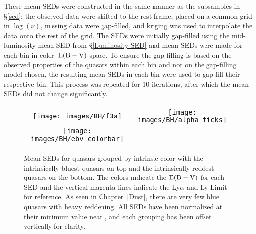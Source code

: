 These mean SEDs were constructed in the same manner as the subsamples in \S\ref{sed}: the observed data were shifted to the rest frame, placed on a common grid in $\log{(\nu)}$, missing data were gap-filled, and kriging was used to interpolate the data onto the rest of the grid.  The SEDs were initially gap-filled using the mid-luminosity mean SED from \S\ref{Luminosity SED} and mean SEDs were made for each bin in color--${\rm E(B-V)}$ space.  To ensure the gap-filling is based on the observed properties of the quasars within each bin and not on the gap-filling model chosen, the resulting mean SEDs in each bin were used to gap-fill their respective bin.  This process was repeated for 10 iterations, after which the mean SEDs did not change significantly.

\begin{figure}[t]
\begin{center}
\begin{tabular}{cc}
	\texttt{[image: images/BH/f3a]} & \texttt{[image: images/BH/alpha\_ticks]}\\
	\hspace{.4cm} \texttt{[image: images/BH/ebv\_colorbar]} &
\end{tabular}
\caption[Mean SEDs grouped by color]{\label{sed_dust} Mean SEDs for quasars grouped by intrinsic color with the intrinsically bluest quasars on top and the intrinsically reddest quasars on the bottom.  The colors indicate the ${\rm E(B-V)}$ for each SED and the vertical magenta lines indicate the Ly$\alpha$ and Ly Limit for reference.  As seen in Chapter~\ref{Dust}, there are very few blue quasars with heavy reddening.  
All SEDs have been normalized at their minimum value near \onemum, and each grouping has been offset vertically for clarity.}
\end{center}
\end{figure}

